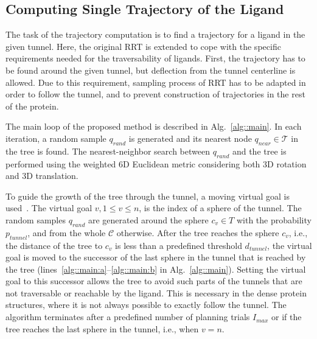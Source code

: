 \documentclass[letterpaper, 10 pt, conference]{ieeeconf} %
\def\qrand{q_{rand}}
\def\qnear{q_{near}}
\def\T{\mathcal{T}}
\def\C{\mathcal{C}}
\def\dt{d_{tunnel}}
\def\rv{R_{tunnel}}
\def\Imax{I_{max}} %
\def\gb{p_{tunnel}}
\begin{document}
\subsection{Computing Single Trajectory of the Ligand}

The task of the trajectory computation is to find a trajectory for a ligand in the given tunnel. 
Here, the original RRT is extended to cope with the specific requirements needed for the traversability of ligands.
First, the trajectory has to be found around the given tunnel, but deflection from the tunnel centerline is allowed.
Due to this requirement, sampling process of RRT has to be adapted in order to follow the tunnel, and to prevent
construction of trajectories in the rest of the protein.

The main loop of the proposed method is described in Alg.~\ref{alg::main}.
In each iteration, a random sample $\qrand$ is generated and its nearest node $\qnear\in\T$ in the tree is found.
The nearest-neighbor search between $\qrand$ and the tree is performed using the weighted 6D Euclidean metric considering
both 3D rotation and 3D translation.

To guide the growth of the tree through the tunnel, a moving virtual goal is used~\cite{vonasek2009rrt}.
The virtual goal $v, 1\le v \le n$, is the index of a sphere of the tunnel.
The random samples $\qrand$ are generated around the sphere $c_v \in T$ with the probability $\gb$, and from the whole $\C$ otherwise.
After the tree reaches the sphere $c_v$, i.e., the distance of the tree to $c_v$ is
less than a predefined threshold $\dt$, the virtual goal is moved to the successor of the last sphere in the tunnel
that is reached by the tree (lines~\ref{alg::main:a}--\ref{alg::main:b} in Alg.~\ref{alg::main}).
Setting the virtual goal to this successor allows the tree to avoid such parts of the tunnels that are not traversable or reachable by the ligand.
This is necessary in the dense protein structures, where it is not always possible to exactly follow the tunnel.
The algorithm terminates after a predefined number of planning trials $\Imax$ or if the tree reaches
the last sphere in the tunnel, i.e., when $v = n$.
\end{document}
